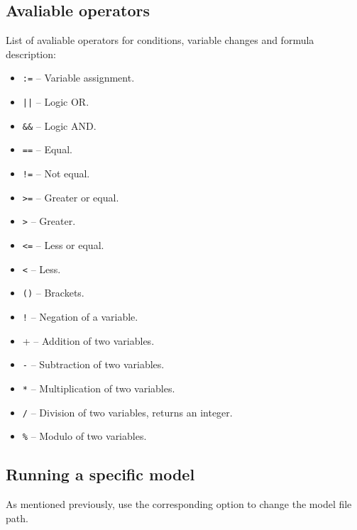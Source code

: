 \documentclass[12pt]{article}
\begin{document}
\subsection{Avaliable operators}
List of avaliable operators for conditions, variable changes and formula description:
\begin{itemize}
  \item \verb+:=+ -- Variable assignment.
  \item \verb+||+ -- Logic OR.
  \item \verb+&&+ -- Logic AND.
  \item \verb+==+ -- Equal.
  \item \verb+!=+ -- Not equal.
  \item \verb+>=+ -- Greater or equal.
  \item \verb+>+ -- Greater.
  \item \verb+<=+ -- Less or equal.
  \item \verb+<+ -- Less.
  \item \verb+()+ -- Brackets.
  \item \verb+!+ -- Negation of a variable.
  \item \verb+++ -- Addition of two variables.
  \item \verb+-+ -- Subtraction of two variables.
  \item \verb+*+ -- Multiplication of two variables.
  \item \verb+/+ -- Division of two variables, returns an integer.
  \item \verb+%+ -- Modulo of two variables.
\end{itemize}



\subsection{Running a specific model}
As mentioned previously, use the corresponding option to change the model file path.
\end{document}
